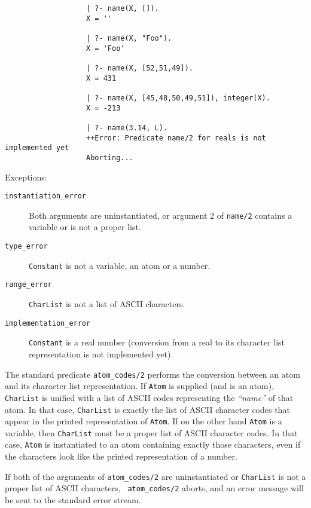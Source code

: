 \begin{description}
{\begin{verbatim}
                   | ?- name(X, []).
                   X = ''

                   | ?- name(X, "Foo").
                   X = 'Foo'

                   | ?- name(X, [52,51,49]).
                   X = 431

                   | ?- name(X, [45,48,50,49,51]), integer(X).
                   X = -213

                   | ?- name(3.14, L).
                   ++Error: Predicate name/2 for reals is not implemented yet
                   Aborting...
     \end{verbatim}}

     Exceptions:
     \begin{description}
     \item[{\tt instantiation\_error}]
	Both arguments are uninstantiated, or argument 2 of {\tt name/2} 
	contains a variable or is not a proper list.
     \item[{\tt type\_error}]
	{\tt Constant} is not a variable, an atom or a number.
     \item[{\tt range\_error}]
	{\tt CharList} is not a list of ASCII characters.
     \item[{\tt implementation\_error}]
	{\tt Constant} is a real number (conversion from a real to its 
	character list representation is not implemented yet).
     \end{description}

    The standard predicate {\tt atom\_codes/2} performs the conversion 
    between an atom and its character list representation. 
    If {\tt Atom} is supplied (and is an atom), {\tt CharList} 
    is unified with a list of ASCII codes representing the {\em ``name''} 
    of that atom.  In that case, {\tt CharList} is exactly the list of 
    ASCII character codes that appear in the printed representation of 
    {\tt Atom}.  If on the other hand {\tt Atom} is a variable, 
    then {\tt CharList} must be a proper list of ASCII character codes. 
    In that case, {\tt Atom} is instantiated to an atom containing
    exactly those characters, even if the characters look like the
    printed representation of a number.

    If both of the arguments of {\tt atom\_codes/2} are uninstantiated or
    {\tt CharList} is not a proper list of ASCII characters, {\tt
    atom\_codes/2} aborts, and an error message will be sent to
    the standard error stream.


\end{description}
